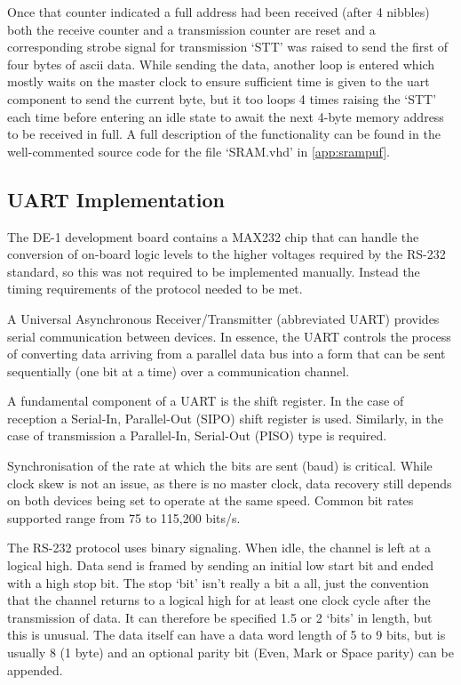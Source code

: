 Once that counter indicated a full address had been received (after 4 nibbles) both the
receive counter and a transmission counter are reset and a corresponding strobe signal
for transmission `STT' was raised to send the first of four bytes of \gls{ascii} data.
While sending the data, another loop is entered which mostly waits on the master clock
to ensure sufficient time is given to the \gls{uart} component to send the current byte,
but it too loops 4 times raising the `STT' each time before entering an idle state to
await the next 4-byte memory address to be received in full. A full description of the
functionality can be found in the well-commented source code for the file `SRAM.vhd' in
\autoref{app:srampuf}.

\subsection{UART Implementation}

The DE-1 development board contains a MAX232 chip that can handle the
conversion of on-board logic levels to the higher voltages required by the
RS-232 standard, so this was not required to be implemented manually.
Instead the timing requirements of the protocol needed to be met.

A Universal Asynchronous Receiver/Transmitter (abbreviated UART) provides
serial communication between devices. In essence, the UART controls the process
of converting data arriving from a parallel data bus into a form that can
be sent sequentially (one bit at a time) over a communication channel.

A fundamental component of a UART is the shift register. In the case of
reception a Serial-In, Parallel-Out (SIPO) shift register is used.
Similarly, in the case of transmission a Parallel-In, Serial-Out (PISO)
type is required.

Synchronisation of the rate at which the bits are sent (baud) is critical.
While clock skew is not an issue, as there is no master clock, data recovery
still depends on both devices being set to operate at the same speed.
Common bit rates supported range from 75 to 115,200 bits/s.

The RS-232 protocol uses binary signaling. When idle, the channel is left at
a logical high.
Data send is framed by sending an initial low start bit and ended with a
high stop bit. The stop `bit' isn't really a bit a all, just the convention
that the channel returns to a logical high for at least one clock cycle
after the transmission of data.
It can therefore be specified 1.5 or 2 `bits' in length, but this is unusual.
The data itself can have a data word length of 5 to 9 bits, but is usually
8 (1 byte) and an optional parity bit (Even, Mark or Space parity)
can be appended.

